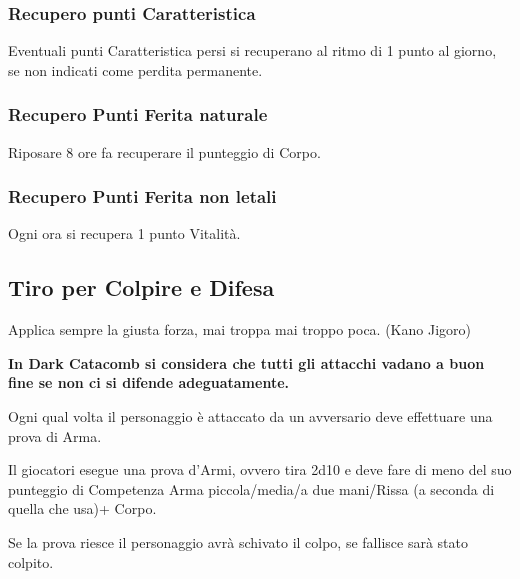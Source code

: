 \documentclass[12pt,a4paper,twoside,openany]{book}
\begin{document}
\begin{multicols}{2}
\subsubsection{Recupero punti Caratteristica}\label{recuperopunticcaratteristica}

Eventuali punti Caratteristica persi si recuperano al ritmo di 1 punto al giorno, se non indicati come perdita permanente.

\subsubsection{Recupero Punti Ferita naturale}\label{recuperopuntiferitanaturale} 

Riposare 8 ore fa recuperare il punteggio di Corpo.

\subsubsection{Recupero Punti Ferita non letali}\label{recuperopuntiferitanonletali}\hypertarget{recuperopuntiferitanonletali}{}

Ogni ora si recupera 1 punto Vitalità.

\subsection{Tiro per Colpire e Difesa}\label{tiropercolpireedifesa}

\begin{changemargin}{0.3cm}{0.3cm}\begin{enfasi}{Applica sempre la giusta forza, mai troppa mai troppo poca. (Kano Jigoro)}\end{enfasi}\end{changemargin}\medskip

\textbf{In Dark Catacomb si considera che tutti gli attacchi vadano a buon fine se non ci si difende adeguatamente.}

Ogni qual volta il personaggio è attaccato da un avversario deve effettuare una prova di Arma.

Il giocatori esegue una prova d'Armi, ovvero tira 2d10 e deve fare di meno del suo punteggio di Competenza Arma piccola/media/a due mani/Rissa (a seconda di quella che usa)+ Corpo. 

Se la prova riesce il personaggio avrà schivato il colpo, se fallisce sarà stato colpito.


\end{multicols}
\end{document}
